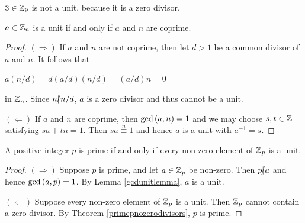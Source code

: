 \documentclass[11pt,fleqn,dvipsnames,usenames]{article}
\begin{document}
\begin{example}
$3\in\mathbb{Z}_9$ is not a unit, because it is a zero divisor.
\end{example}
%
\begin{lemma}\label{gcdunitlemma}
$a\in\mathbb{Z}_{n}$ is a unit if and only if $a$ and $n$ are coprime.
\end{lemma}
%
\begin{proof}\phantom{-}

$(\Rightarrow)$ If $a$ and $n$ are not coprime, then let $d>1$ be a common divisor of $a$ and $n$.  It follows that
\begin{center}
$a(n/d) = d(a/d)(n/d) = (a/d)n = 0$
\end{center}
in $\mathbb{Z}_{n}$.  Since $n|\kern-0.9ex{/} n/d$, $a$ is a zero divisor and thus cannot be a unit.

$(\Leftarrow)$ If $a$ and $n$ are coprime, then $\text{gcd}\left(a,n\right) = 1$ and we may choose $s,t\in\mathbb{Z}$ satisfying $sa + tn = 1$.  Then $sa\overset{n}{\equiv} 1$ and hence $a$ is a unit with $a^{-1} = s$.
\end{proof}
%
\begin{theorem}\label{Znallunits}
A positive integer $p$ is prime if and only if every non-zero element of $\mathbb{Z}_p$ is a unit.
\end{theorem}
%
\begin{proof}\phantom{-}

$(\Rightarrow)$ Suppose $p$ is prime, and let $a\in\mathbb{Z}_p$ be non-zero.  Then $p|\kern-0.9ex{/} a$ and hence $\text{gcd}\left(a,p\right) = 1$.  By Lemma \ref{gcdunitlemma}, $a$ is a unit.

$(\Leftarrow)$ Suppose every non-zero element of $\mathbb{Z}_p$ is a unit.  Then $\mathbb{Z}_p$ cannot contain a zero divisor.  By Theorem \ref{primepnozerodivisors}, $p$ is prime.
\end{proof}
\end{document}

